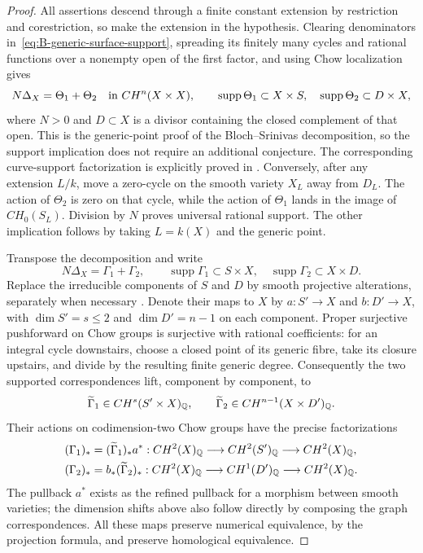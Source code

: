 \begin{proof}
All assertions descend through a finite constant extension by
restriction and corestriction, so make the extension in the hypothesis.
Clearing denominators in~\eqref{eq:B-generic-surface-support},
spreading its finitely many cycles and rational functions over a
nonempty open of the first factor, and using Chow localization gives
\[
 N\Delta_X=\Theta_1+\Theta_2\quad\hbox{in }CH^n(X\times X),
 \qquad
 \operatorname{supp}\Theta_1\subset X\times S,
 \quad\operatorname{supp}\Theta_2\subset D\times X,
\]
where \(N>0\) and \(D\subset X\) is a divisor containing the
closed complement of that open.  This is the generic-point proof
of the Bloch--Srinivas decomposition, so the support implication
does not require an additional conjecture.  The corresponding
curve-support factorization is explicitly proved in
\citet[Lemma~5.1 and its proof, p.~841]{BFuVial2023}.
Conversely, after any extension \(L/k\), move a zero-cycle on the
smooth variety \(X_L\) away from \(D_L\).  The action of
\(\Theta_2\) is zero on that cycle, while the action of
\(\Theta_1\) lands in the image of \(CH_0(S_L)\).
Division by \(N\) proves universal rational support.  The other
implication follows by taking \(L=k(X)\) and the generic point.

Transpose the decomposition and write
\[
 N\Delta_X=\Gamma_1+\Gamma_2,
 \qquad
 \operatorname{supp}\Gamma_1\subset S\times X,
 \quad\operatorname{supp}\Gamma_2\subset X\times D.
 \tag{B.S2}\label{eq:B-transposed-surface-support}
\]
Replace the irreducible components of \(S\) and \(D\) by smooth
projective alterations, separately when necessary
\citep[Theorem~4.1 and Remark~4.2]{c_dejong1996}.  Denote their
maps to \(X\) by \(a:S'\to X\) and \(b:D'\to X\), with
\(\dim S'=s\leq2\) and \(\dim D'=n-1\) on each component.
Proper surjective pushforward on Chow groups is surjective with
rational coefficients: for an integral cycle downstairs, choose a
closed point of its generic fibre, take its closure upstairs, and
divide by the resulting finite generic degree.  Consequently the
two supported correspondences lift, component by component, to
\[
 \widetilde\Gamma_1\in CH^{s}(S'\times X)_{\mathbb Q},
 \qquad
 \widetilde\Gamma_2\in CH^{n-1}(X\times D')_{\mathbb Q}.
\]
Their actions on codimension-two Chow groups have the precise
factorizations
\[
\begin{aligned}
 (\Gamma_1)_*&=(\widetilde\Gamma_1)_*a^*:
 CH^2(X)_{\mathbb Q}\longrightarrow CH^2(S')_{\mathbb Q}
                 \longrightarrow CH^2(X)_{\mathbb Q},\\
 (\Gamma_2)_*&=b_*(\widetilde\Gamma_2)_*:
 CH^2(X)_{\mathbb Q}\longrightarrow CH^1(D')_{\mathbb Q}
                 \longrightarrow CH^2(X)_{\mathbb Q}.
\end{aligned}
\]
The pullback \(a^*\) exists as the refined pullback for a
morphism between smooth varieties; the dimension shifts above
also follow directly by composing the graph correspondences.
All these maps preserve numerical equivalence, by the projection
formula, and preserve homological equivalence.


\end{proof}
